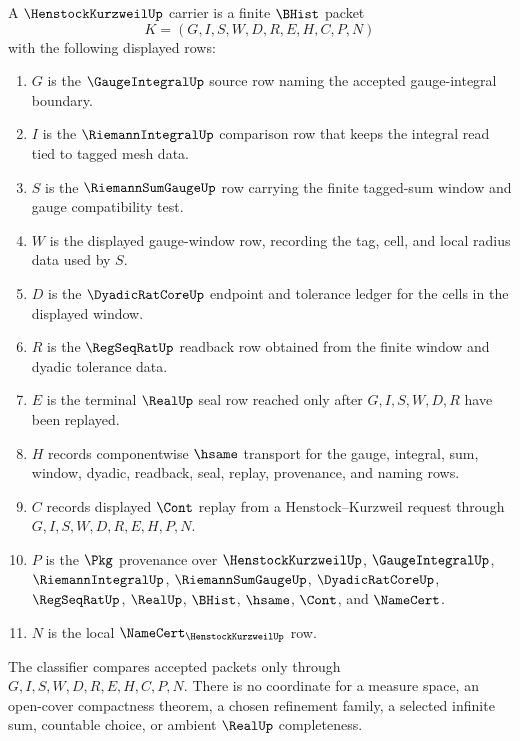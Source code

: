 \begin{definition}
\label{def:henstock-kurzweil-carrier}
A $\HenstockKurzweilUp$ carrier is a finite $\BHist$ packet
$$
K=(G,I,S,W,D,R,E,H,C,P,N)
$$
with the following displayed rows:
\begin{enumerate}
\item $G$ is the $\GaugeIntegralUp$ source row naming the accepted gauge-integral boundary.
\item $I$ is the $\RiemannIntegralUp$ comparison row that keeps the integral read tied to tagged mesh data.
\item $S$ is the $\RiemannSumGaugeUp$ row carrying the finite tagged-sum window and gauge compatibility test.
\item $W$ is the displayed gauge-window row, recording the tag, cell, and local radius data used by $S$.
\item $D$ is the $\DyadicRatCoreUp$ endpoint and tolerance ledger for the cells in the displayed window.
\item $R$ is the $\RegSeqRatUp$ readback row obtained from the finite window and dyadic tolerance data.
\item $E$ is the terminal $\RealUp$ seal row reached only after $G,I,S,W,D,R$ have been replayed.
\item $H$ records componentwise $\hsame$ transport for the gauge, integral, sum, window, dyadic, readback, seal, replay, provenance, and naming rows.
\item $C$ records displayed $\Cont$ replay from a Henstock--Kurzweil request through $G,I,S,W,D,R,E,H,P,N$.
\item $P$ is the $\Pkg$ provenance over $\HenstockKurzweilUp$, $\GaugeIntegralUp$, $\RiemannIntegralUp$, $\RiemannSumGaugeUp$, $\DyadicRatCoreUp$, $\RegSeqRatUp$, $\RealUp$, $\BHist$, $\hsame$, $\Cont$, and $\NameCert$.
\item $N$ is the local $\NameCert_{\HenstockKurzweilUp}$ row.
\end{enumerate}
The classifier compares accepted packets only through $G,I,S,W,D,R,E,H,C,P,N$. There is no coordinate for a measure space, an open-cover compactness theorem, a chosen refinement family, a selected infinite sum, countable choice, or ambient $\RealUp$ completeness.
\end{definition}

